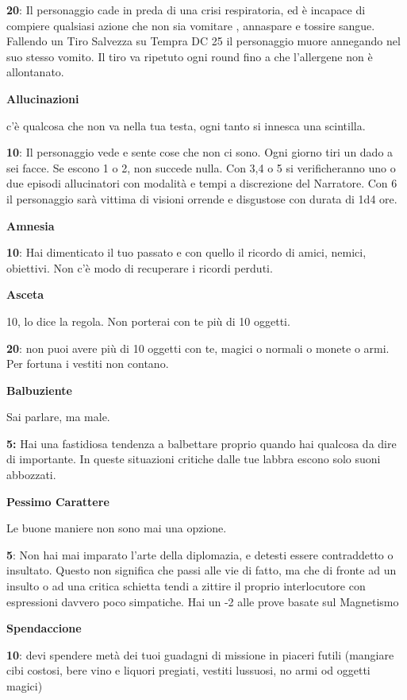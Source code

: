\documentclass[a4paper,11pt,twoside,openany]{book}
\begin{document}
\textbf{20}: Il personaggio cade in preda di una crisi respiratoria, ed è incapace di compiere qualsiasi azione che non sia vomitare , annaspare e tossire sangue. Fallendo un Tiro Salvezza su Tempra DC 25 il personaggio muore annegando nel suo stesso vomito. Il tiro va ripetuto ogni round fino a che l'allergene non è allontanato.

\textbf{Allucinazioni}

c'è qualcosa che non va nella tua testa, ogni tanto si innesca una scintilla.

\textbf{10}: Il personaggio vede e sente cose che non ci sono. Ogni giorno tiri un dado a sei facce.
Se escono 1 o 2, non succede nulla.
Con 3,4 o 5 si verificheranno uno o due episodi allucinatori con modalità e tempi a discrezione del Narratore.
Con 6 il personaggio sarà vittima di visioni orrende e disgustose con durata di 1d4 ore.

\textbf{Amnesia}

\textbf{10}: Hai dimenticato il tuo passato e con quello il ricordo di amici, nemici, obiettivi. Non c'è modo di recuperare i ricordi perduti.

\textbf{Asceta}

10, lo dice la regola. Non porterai con te più di 10 oggetti.

\textbf{20}: non puoi avere più di 10 oggetti con te, magici o normali o monete o armi. Per fortuna i vestiti non contano.

\textbf{Balbuziente}

Sai parlare, ma male.

\textbf{5:} Hai una fastidiosa tendenza a balbettare proprio quando hai qualcosa da dire di importante. In queste situazioni critiche dalle tue labbra escono solo suoni abbozzati.

\textbf{Pessimo Carattere}

Le buone maniere non sono mai una opzione.

\textbf{5}: Non hai mai imparato l'arte della diplomazia, e detesti essere contraddetto o insultato. Questo non significa che passi alle vie di fatto, ma che di fronte ad un insulto o ad una critica schietta tendi a zittire il proprio interlocutore con espressioni davvero poco simpatiche. Hai un -2 alle prove basate sul Magnetismo

\textbf{Spendaccione}

\textbf{10}: devi spendere metà dei tuoi guadagni di missione in piaceri futili (mangiare cibi costosi, bere vino e liquori pregiati, vestiti lussuosi, no armi od oggetti magici)
\end{document}
